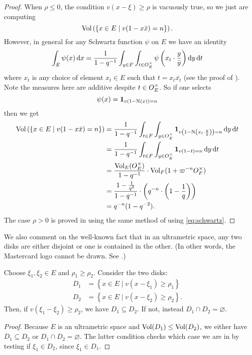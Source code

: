\begin{proof}
  When $\rho \le 0$, the condition $v(x - \xi) \ge \rho$ is vacuously true,
  so we just are computing
  \[ \operatorname{Vol}\left( \left\{ x \in E \mid v(1-x \bar x) = n \right\} \right). \]
  However, in general for any Schwartz function $\psi$ on $E$ we have an identity
  \begin{equation}
    \int_E \psi(x) \odif x
    = \frac{1}{1-q\inv} \int_{y \in F} \int_{t \in \OO_E^\times}
    \psi\left( x_t \cdot \frac{y}{\bar y} \right) \odif y \odif t
    \label{eq:schwartz}
  \end{equation}
  where $x_t$ is any choice of element $x_t \in E$ such that $t = x_t \bar{x_t}$
  (see the proof of \cite[Lemma 4.4]{ref:AFL}).
  Note the measures here are additive despite $t \in O_E^\times$.
  So if one selects
  \[ \psi(x) = \mathbf{1}_{v(1 - \operatorname{N}(x)) = n} \]
  then we get
  \begin{align*}
    \Vol\left( \left\{ x \in E \mid v(1-x \bar x) = n \right\} \right)
    &= \frac{1}{1-q\inv} \int_{t \in F} \int_{y \in \OO_E^\times}
    \mathbf{1}_{v\left( 1 - \Norm\left(x_t \cdot \frac{y}{\bar y} \right) \right) = n} \odif y \odif t \\
    &= \frac{1}{1-q\inv} \int_{t \in F} \int_{y \in \OO_E^\times}
    \mathbf{1}_{v\left( 1 - t \right) = n} \odif y \odif t \\
    &= \frac{\Vol_E(\OO_E^\times)}{1-q\inv} \cdot \Vol_F(1 + \varpi^{-n} \OO_F^\times) \\
    &= \frac{1 - \frac{1}{q^2}}{1-q\inv}
      \cdot \left( q^{-n} \cdot \left( 1 - \frac 1q \right) \right) \\
    &= q^{-n} (1-q^{-2}).
  \end{align*}
  The case $\rho > 0$ is proved in \cite[Lemma 4.4]{ref:AFL}
  using the same method of using \eqref{eq:schwartz}.
\end{proof}

We also comment on the well-known fact that in an ultrametric space,
any two disks are either disjoint or one is contained in the other.
(In other words, the Mastercard logo cannot be drawn. See .)
\begin{proposition}
  Choose $\xi_1, \xi_2 \in E$ and $\rho_1 \geq \rho_2$.
  Consider the two disks:
  \begin{align*}
    D_1 &= \left\{ x \in E \mid v(x-\xi_1) \ge \rho_1 \right\} \\
    D_2 &= \left\{ x \in E \mid v(x-\xi_2) \ge \rho_2 \right\}.
  \end{align*}
  Then, if $v(\xi_1-\xi_2) \geq \rho_2$, we have $D_1 \subseteq D_2$.
  If not, instead $D_1 \cap D_2 = \varnothing$.
  \label{prop:no_mastercard}
\end{proposition}
\begin{proof}
  Because $E$ is an ultrametric space and $\operatorname{Vol}(D_1) \leq \operatorname{Vol}(D_2)$,
  we either have $D_1 \subseteq D_2$ or $D_1 \cap D_2 = \varnothing$.
  The latter condition checks which case we are in by testing if $\xi_1 \in D_2$,
  since $\xi_1 \in D_1$.
\end{proof}

